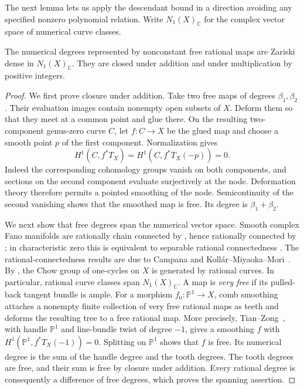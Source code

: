 The next lemma lets us apply the descendant bound in a direction
avoiding any specified nonzero polynomial relation.  Write
\(N_1(X)_{\mathbb C}\) for the complex vector space of numerical
curve classes.

\begin{lemma}
\label{lem:free-dense}
The numerical degrees represented by nonconstant free rational maps
are Zariski dense in \(N_1(X)_{\mathbb C}\).  They are closed under
addition and under multiplication by positive integers.
\end{lemma}

\begin{proof}
We first prove closure under addition.  Take two free maps of degrees
\(\beta_1,\beta_2\).  Their evaluation images contain nonempty open
subsets of \(X\).  Deform them so that they meet at a common point
and glue there.  On the resulting two-component genus-zero curve
\(C\), let \(f:C\to X\) be the glued map and choose a smooth point
\(p\) of the first component.  Normalization gives
\[
  H^1(C,f^*T_X)=H^1(C,f^*T_X(-p))=0.
\]
Indeed the corresponding cohomology groups vanish on both
components, and sections on the second component evaluate
surjectively at the node.  Deformation theory therefore permits
a pointed smoothing of the node.  Semicontinuity of the second
vanishing shows that the smoothed map is free.  Its degree is
\(\beta_1+\beta_2\).

We next show that free degrees span the numerical vector space.
Smooth complex Fano manifolds are rationally chain connected by
\cite[Corollary~3.2]{Campana1992}, hence rationally connected by
\cite[Theorem~2.49]{Debarre2011}; in characteristic zero this is
equivalent to separable rational connectedness
\cite[Definition~2.20 and the following discussion]{Debarre2011}.
The rational-connectedness results are due to Campana and
Koll\'ar--Miyaoka--Mori~\cite{Campana1992,KollarMiyaokaMori1992}.
By \cite[Theorem~1.3]{TianZong2014}, the Chow group of one-cycles on \(X\)
is generated by rational curves.  In particular, rational curve
classes span \(N_1(X)_{\mathbb C}\).
A map is \emph{very free}
if its pulled-back tangent bundle is ample.  For a morphism
\(f_0:\mathbb P^1\to X\), comb smoothing attaches a nonempty finite
collection of very free rational maps as teeth and deforms the resulting
tree to a free rational map.  More precisely,
Tian--Zong~\cite[Proposition~2.4]{TianZong2014}, with handle
\(\mathbb P^1\) and line-bundle twist of degree \(-1\), gives a
smoothing \(f\) with \(H^1(\mathbb P^1,f^*T_X(-1))=0\).
Splitting on \(\mathbb P^1\) shows that \(f\) is free.  Its numerical
degree is the sum of the handle degree and the tooth degrees.
The tooth degrees are free, and their sum is free by closure under
addition.  Every rational degree is consequently a difference of
free degrees, which proves the spanning assertion.


\end{proof}
